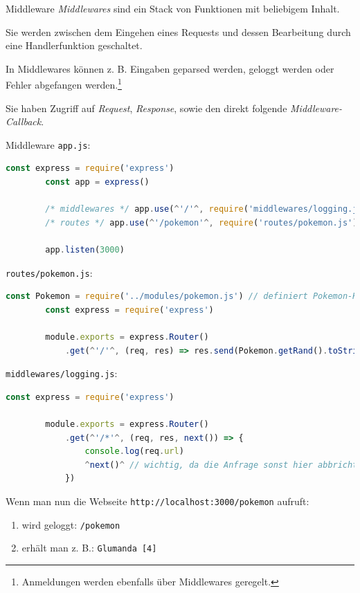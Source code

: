 \begin{defi}{Middleware}
    \emph{Middlewares} sind ein Stack von Funktionen mit beliebigem Inhalt.

    Sie werden zwischen dem Eingehen eines Requests und dessen Bearbeitung durch eine Handlerfunktion geschaltet.

    In Middlewares können z. B. Eingaben geparsed werden, geloggt werden oder Fehler abgefangen werden.\footnote{Anmeldungen werden ebenfalls über Middlewares geregelt.}

    Sie haben Zugriff auf \emph{Request}, \emph{Response}, sowie den direkt folgende \emph{Middleware-Callback}.
\end{defi}

\begin{example}{Middleware}
    \texttt{app.js}:
    \begin{lstlisting}[language=JavaScript]
        const express = require('express')
        const app = express()

        /* middlewares */ app.use(^'/'^, require('middlewares/logging.js')) // 1.
        /* routes */ app.use(^'/pokemon'^, require('routes/pokemon.js')) // 2.

        app.listen(3000)
    \end{lstlisting}

    \texttt{routes/pokemon.js}:
    \begin{lstlisting}[language=JavaScript]
        const Pokemon = require('../modules/pokemon.js') // definiert Pokemon-Klasse
        const express = require('express')
        
        module.exports = express.Router()
            .get(^'/'^, (req, res) => res.send(Pokemon.getRand().toString()) )
    \end{lstlisting}

    \texttt{middlewares/logging.js}:
    \begin{lstlisting}[language=JavaScript]
        const express = require('express')
        
        module.exports = express.Router()
            .get(^'/*'^, (req, res, next()) => {
                console.log(req.url)
                ^next()^ // wichtig, da die Anfrage sonst hier abbricht
            })
    \end{lstlisting}

    Wenn man nun die Webseite \texttt{http://localhost:3000/pokemon} aufruft:
    \begin{enumerate}
        \item wird geloggt: \texttt{/pokemon}
        \item erhält man z. B.: \texttt{Glumanda [4]}
    \end{enumerate}
\end{example}

